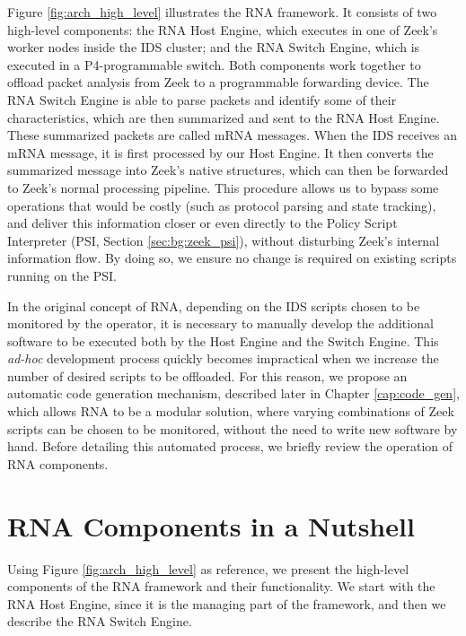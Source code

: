 Figure \ref{fig:arch_high_level} illustrates the RNA framework. It consists of two high-level components: the RNA Host Engine, which executes in one of Zeek's worker nodes inside the IDS cluster; and the RNA Switch Engine, which is executed in a P4-programmable switch. Both components work together to offload packet analysis from Zeek to a programmable forwarding device. The RNA Switch Engine is able to parse packets and identify some of their characteristics, which are then summarized and sent to the RNA Host Engine. These summarized packets are called mRNA messages. When the IDS receives an mRNA message, it is first processed by our Host Engine. It then converts the summarized message into Zeek's native structures, which can then be forwarded to Zeek's normal processing pipeline. This procedure allows us to bypass some operations that would be costly (such as protocol parsing and state tracking), and deliver this information closer or even directly to the Policy Script Interpreter (PSI, Section \ref{sec:bg:zeek_psi}), without disturbing Zeek's internal information flow. By doing so, we ensure no change is required on existing scripts running on the PSI.

In the original concept of RNA, depending on the IDS scripts chosen to be monitored by the operator, it is necessary to manually develop the additional software to be executed both by the Host Engine and the Switch Engine. This \textit{ad-hoc} development process quickly becomes impractical when we increase the number of desired scripts to be offloaded. For this reason, we propose an automatic code generation mechanism, described later in Chapter \ref{cap:code_gen}, which allows RNA to be a modular solution, where varying combinations of Zeek scripts can be chosen to be monitored, without the need to write new software by hand. Before detailing this automated process, we briefly review the operation of RNA components.

\section{RNA Components in a Nutshell}
\label{sec:rna:overview}

Using Figure \ref{fig:arch_high_level} as reference, we present the high-level components of the RNA framework and their functionality. We start with the RNA Host Engine, since it is the managing part of the framework, and then we describe the RNA Switch Engine.

